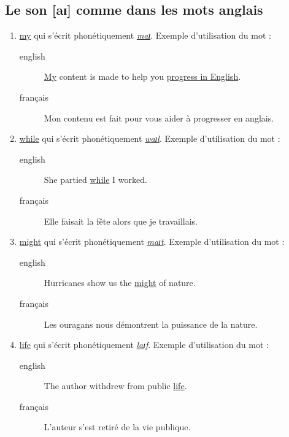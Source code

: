 \subsection{Le son [aɪ] comme dans les mots anglais}
\label{sec:ai}
\begin{enumerate}
\item \href{http://www.wordreference.com/enfr/my}{my} qui s'écrit phonétiquement \href{https://dictionary.cambridge.org/dictionary/english/my}{\emph{maɪ}}. Exemple d'utilisation du mot :
\begin{description}
\item[{english}] \textenglish{\href{https://youtu.be/SMwEkjcEACM}{My} content is made to help you \href{https://www.youtube.com/watch?v=m\_uWS6K-VF8\&list=PL0J5xb8JH3VukoRHgk86Yr9BSVeBewCuZ}{progress in English}.}
\item[{français}] Mon contenu est fait pour vous aider à progresser en
anglais.
\end{description}
\item \href{http://www.wordreference.com/enfr/while}{while} qui s'écrit phonétiquement \href{https://dictionary.cambridge.org/dictionary/english/while}{\emph{waɪl}}. Exemple d'utilisation du mot :
\begin{description}
\item[{english}] \textenglish{She partied \href{https://youtu.be/8q182kWAhiM}{while} I worked.}
\item[{français}] Elle faisait la fête alors que je travaillais.
\end{description}
\item \href{http://www.wordreference.com/enfr/might}{might} qui s'écrit phonétiquement \href{https://dictionary.cambridge.org/dictionary/english/might}{\emph{maɪt}}. Exemple d'utilisation du mot :
\begin{description}
\item[{english}] \textenglish{Hurricanes show us the \href{https://youtu.be/Nqlr35WnqTk}{might} of nature.}
\item[{français}] Les ouragans nous démontrent la puissance de la
nature.
\end{description}
\item \href{http://www.wordreference.com/enfr/life}{life} qui s'écrit phonétiquement \href{https://dictionary.cambridge.org/dictionary/english/life}{\emph{laɪf}}. Exemple d'utilisation du mot :
\begin{description}
\item[{english}] \textenglish{The author withdrew from public \href{https://youtu.be/zyKGKoGACVk}{life}.}
\item[{français}] L'auteur s'est retiré de la vie publique.
\end{description}
\end{enumerate}
